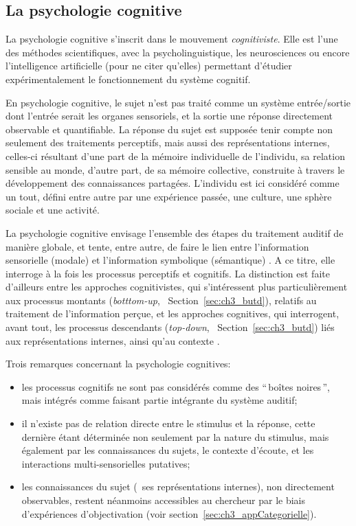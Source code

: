 \subsection{La psychologie cognitive}
\label{sec:ch3_psychoCogDef}

La psychologie cognitive s'inscrit dans le mouvement \emph{cognitiviste}. Elle est l'une des méthodes scientifiques, avec la psycholinguistique, les neurosciences ou encore l'intelligence artificielle (pour ne citer qu'elles) permettant d'étudier expérimentalement le fonctionnement du système cognitif.

En psychologie cognitive, le sujet n'est pas traité comme un système entrée/sortie dont l'entrée serait les organes sensoriels, et la sortie une réponse directement observable et quantifiable. La réponse du sujet est supposée tenir compte non seulement des traitements perceptifs, mais aussi des représentations internes, celles-ci résultant d'une part de la mémoire individuelle de l'individu, sa relation sensible au monde, d'autre part, de sa mémoire collective, construite à travers le développement des connaissances partagées. L'individu est ici considéré comme un tout, défini entre autre par une expérience passée, une culture, une sphère sociale et une activité.

La psychologie cognitive envisage l'ensemble des étapes du traitement auditif de manière globale, et tente, entre autre, de faire le lien entre l'information sensorielle (modale) et l'information symbolique (sémantique) \citep{mcadams1994penser}. A ce titre, elle interroge à la fois les processus perceptifs et cognitifs. La distinction est faite d'ailleurs entre les approches cognitivistes, qui s'intéressent plus particulièrement aux processus montants (\emph{botttom-up}, \cf~Section~\ref{sec:ch3_butd}), relatifs au traitement de l'information perçue, et les approches cognitives, qui interrogent, avant tout, les processus descendants (\emph{top-down}, \cf~Section~\ref{sec:ch3_butd}) liés aux représentations internes, ainsi qu'au contexte \citep[p. 34]{guastavino_etude_2003}. 

Trois remarques concernant la psychologie cognitives:

\begin{itemize}
\item les processus cognitifs ne sont pas considérés comme des ``\,boîtes noires\,'', mais intégrés comme faisant partie intégrante du système auditif;
\item il n'existe pas de relation directe entre le stimulus et la réponse, cette dernière étant déterminée non seulement par la nature du stimulus, mais également par les connaissances du sujets, le contexte d'écoute, et les interactions multi-sensorielles putatives;
\item les connaissances du sujet (\ie~ses représentations internes), non directement observables, restent néanmoins accessibles au chercheur par le biais d'expériences d'objectivation (voir section~\ref{sec:ch3_appCategorielle}).
\end{itemize}

